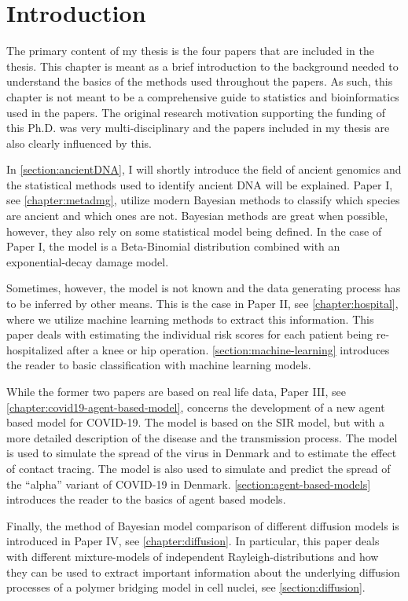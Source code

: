 
\chapter{Introduction}
The primary content of my thesis is the four papers that are included in the thesis. This chapter is meant as a brief introduction to the background needed to understand the basics of the methods used throughout the papers. As such, this chapter is not meant to be a comprehensive guide to statistics and bioinformatics used in the papers. The original research motivation supporting the funding of this Ph.D. was very multi-disciplinary and the papers included in my thesis are also clearly influenced by this.

In \autoref{section:ancientDNA}, I will shortly introduce the field of ancient genomics and the statistical methods used to identify ancient DNA will be explained. Paper I, see \autoref{chapter:metadmg}, utilize modern Bayesian methods to classify which species are ancient and which ones are not. Bayesian methods are great when possible, however, they also rely on some statistical model being defined. In the case of Paper I, the model is a Beta-Binomial distribution combined with an exponential-decay damage model.

Sometimes, however, the model is not known and the data generating process has to be inferred by other means. This is the case in Paper II, see \autoref{chapter:hospital}, where we utilize machine learning methods to extract this information. This paper deals with estimating the individual risk scores for each patient being re-hospitalized after a knee or hip operation. \autoref{section:machine-learning} introduces the reader to basic classification with machine learning models.

While the former two papers are based on real life data, Paper III, see \autoref{chapter:covid19-agent-based-model}, concerns the development of a new agent based model for COVID-19. The model is based on the SIR model, but with a more detailed description of the disease and the transmission process. The model is used to simulate the spread of the virus in Denmark and to estimate the effect of contact tracing. The model is also used to simulate and predict the spread of the ``alpha'' variant of COVID-19 in Denmark. \autoref{section:agent-based-models} introduces the reader to the basics of agent based models.

Finally, the method of Bayesian model comparison of different diffusion models is introduced in Paper IV, see \autoref{chapter:diffusion}. In particular, this paper deals with different mixture-models of independent Rayleigh-distributions and how they can be used to extract important information about the underlying diffusion processes of a polymer bridging model in cell nuclei, see \autoref{section:diffusion}.

